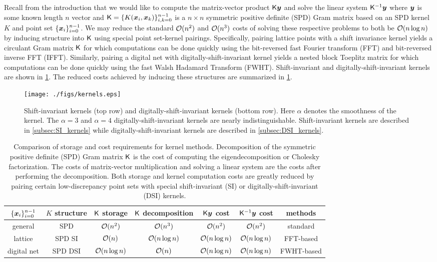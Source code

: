 \documentclass[acmsmall]{acmart}
\begin{document}
Recall from the introduction that we would like to compute the matrix-vector product ${\mathsf{K}} {\boldsymbol{y}}$ and solve the linear system ${\mathsf{K}}^{-1} {\boldsymbol{y}}$ where ${\boldsymbol{y}}$ is some known length $n$ vector and ${\mathsf{K}} = \{K({\boldsymbol{x}}_i,{\boldsymbol{x}}_k)\}_{i,k=0}^{n-1}$ is a $n \times n$ symmetric positive definite (SPD) Gram matrix based on an SPD kernel $K$ and point set $\{{\boldsymbol{x}}_i\}_{i=0}^{n-1}$. We may reduce the standard ${\mathcal{O}}(n^2)$ and ${\mathcal{O}}(n^3)$ costs of solving these respective problems to both be ${\mathcal{O}}(n \log n)$ by inducing structure into ${\mathsf{K}}$ using special point set-kernel pairings. Specifically, pairing lattice points with a shift invariance kernel yields a circulant Gram matrix ${\mathsf{K}}$ for which computations can be done quickly using the bit-reversed fast Fourier transform (FFT) and bit-reversed inverse FFT (IFFT). Similarly, pairing a digital net with digitally-shift-invariant kernel yields a nested block Toeplitz matrix for which computations can be done quickly using the fast Walsh Hadamard Transform (FWHT). Shift-invariant and digitally-shift-invariant kernels are shown in \cref{fig:SI_DSI_kernels}. The reduced costs achieved by inducing these structures are summarized in \cref{tab:com_kernel_costs}.

\begin{figure}%
    \centering
    \texttt{[image: ./figs/kernels.eps]}
    \caption{Shift-invariant kernels (top row) and digitally-shift-invariant kernels (bottom row). Here $\alpha$ denotes the smoothness of the kernel. The $\alpha=3$ and $\alpha=4$ digitally-shift-invariant kernels are nearly indistinguishable. Shift-invariant kernels are described in \cref{subsec:SI_kernels} while digitally-shift-invariant kernels are described in \cref{subsec:DSI_kernels}.}
    \Description[]{}
    \label{fig:SI_DSI_kernels}
\end{figure}

\begin{table}[H]
    \centering
    \begin{tabular}{ccccccc} 
        $\{{\boldsymbol{x}}_i\}_{i=0}^{n-1}$ & $K$ structure & ${\mathsf{K}}$ storage & ${\mathsf{K}}$ decomposition & ${\mathsf{K}} {\boldsymbol{y}}$ cost & ${\mathsf{K}}^{-1} {\boldsymbol{y}}$ cost & methods \\ 
        \hline 
        general & SPD & ${\mathcal{O}}(n^2)$ & ${\mathcal{O}}(n^3)$ & ${\mathcal{O}}(n^2)$ & ${\mathcal{O}}(n^2)$ & standard  \\
        lattice & SPD SI & ${\mathcal{O}}(n)$ & ${\mathcal{O}}(n \log n)$ & ${\mathcal{O}}(n \log n)$ & ${\mathcal{O}}(n \log n)$ & FFT-based \\ 
        digital net & SPD DSI & ${\mathcal{O}}(n \log n)$ & ${\mathcal{O}}(n)$ & ${\mathcal{O}}(n \log n)$ & ${\mathcal{O}}(n \log n)$ &FWHT-based
    \end{tabular}
    \caption{Comparison of storage and cost requirements for kernel methods. Decomposition of the symmetric positive definite (SPD) Gram matrix ${\mathsf{K}}$ is the cost of computing the eigendecomposition or Cholesky factorization. The costs of matrix-vector multiplication and solving a linear system are the costs after performing the decomposition. Both storage and kernel computation costs are greatly reduced by pairing certain low-discrepancy point sets with special shift-invariant (SI) or digitally-shift-invariant (DSI) kernels.}
    \label{tab:com_kernel_costs}
\end{table}
\end{document}
